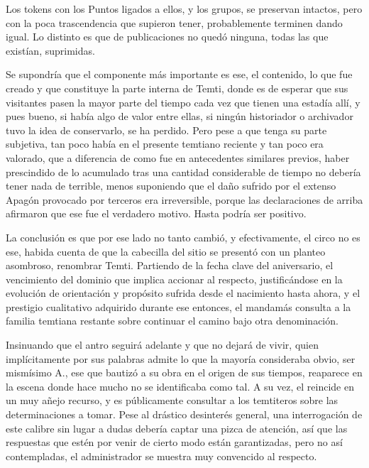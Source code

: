 \documentclass[
]{book}
\begin{document}
Los tokens con los Puntos ligados a ellos, y los grupos, se preservan intactos, pero con la poca trascendencia que supieron tener, probablemente terminen dando igual. Lo distinto es que de publicaciones no quedó ninguna, todas las que existían, suprimidas.

Se supondría que el componente más importante es ese, el contenido, lo que fue creado y que constituye la parte interna de Temti, donde es de esperar que sus visitantes pasen la mayor parte del tiempo cada vez que tienen una estadía allí, y pues bueno, si había algo de valor entre ellas, si ningún historiador o archivador tuvo la idea de conservarlo, se ha perdido. Pero pese a que tenga su parte subjetiva, tan poco había en el presente temtiano reciente y tan poco era valorado, que a diferencia de como fue en antecedentes similares previos, haber prescindido de lo acumulado tras una cantidad considerable de tiempo no debería tener nada de terrible, menos suponiendo que el daño sufrido por el extenso Apagón provocado por terceros era irreversible, porque las declaraciones de arriba afirmaron que ese fue el verdadero motivo. Hasta podría ser positivo.

La conclusión es que por ese lado no tanto cambió, y efectivamente, el circo no es ese, habida cuenta de que la cabecilla del sitio se presentó con un planteo asombroso, renombrar Temti. Partiendo de la fecha clave del aniversario, el vencimiento del dominio que implica accionar al respecto, justificándose en la evolución de orientación y propósito sufrida desde el nacimiento hasta ahora, y el prestigio cualitativo adquirido durante ese entonces, el mandamás consulta a la familia temtiana restante sobre continuar el camino bajo otra denominación.

Insinuando que el antro seguirá adelante y que no dejará de vivir, quien implícitamente por sus palabras admite lo que la mayoría consideraba obvio, ser mismísimo A., ese que bautizó a su obra en el origen de sus tiempos, reaparece en la escena donde hace mucho no se identificaba como tal. A su vez, el reincide en un muy añejo recurso, y es públicamente consultar a los temtiteros sobre las determinaciones a tomar. Pese al drástico desinterés general, una interrogación de este calibre sin lugar a dudas debería captar una pizca de atención, así que las respuestas que estén por venir de cierto modo están garantizadas, pero no así contempladas, el administrador se muestra muy convencido al respecto.
\end{document}
